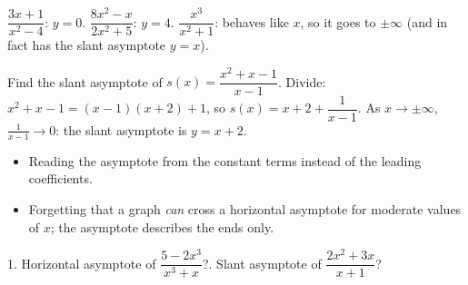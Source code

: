 \begin{example}
\sol $\dfrac{3x+1}{x^2-4}$: $y=0$. \quad $\dfrac{8x^2-x}{2x^2+5}$: $y=4$. \quad $\dfrac{x^3}{x^2+1}$: behaves like $x$, so it goes to $\pm\infty$ (and in fact has the slant asymptote $y=x$).
\end{example}

\begin{example}
Find the slant asymptote of $s(x)=\dfrac{x^2+x-1}{x-1}$.
\sol Divide: $x^2+x-1=(x-1)(x+2)+1$, so $s(x)=x+2+\dfrac{1}{x-1}$. As $x\to\pm\infty$, $\frac1{x-1}\to0$: the slant asymptote is $y=x+2$.
\begin{center}
\end{center}
\end{example}

\begin{mistakes}
\begin{itemize}
\item Reading the asymptote from the constant terms instead of the leading coefficients.
\item Forgetting that a graph \emph{can} cross a horizontal asymptote for moderate values of $x$; the asymptote describes the ends only.
\end{itemize}
\end{mistakes}

\begin{quickcheck}
1. Horizontal asymptote of $\dfrac{5-2x^3}{x^3+x}$?. Slant asymptote of $\dfrac{2x^2+3x}{x+1}$?
\end{quickcheck}


